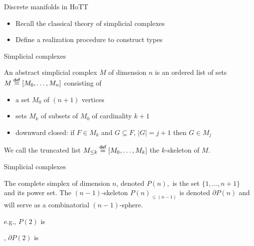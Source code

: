\documentclass[14pt,aspectratio=169]{beamer}
\renewcommand{\defemph}[1]{\alert{#1}}
\begin{document}
\begin{frame}{Discrete manifolds in HoTT}
\begin{itemize}
\item Recall the classical theory of \alert{simplicial complexes}
\item Define a \alert{realization} procedure to construct types
\end{itemize}
\end{frame}

\begin{frame}{Simplicial complexes}
\begin{mydef}
An \defemph{abstract simplicial complex \( M \) of dimension \( n \)} is an ordered list of sets \( M\stackrel{\mathsf{def}}{=}[M_0,\ldots,M_n] \) consisting of 
\begin{itemize}
\item a set \( M_0 \) of \( (n+1) \) vertices
\item sets \( M_k \) of subsets of \( M_0 \) of cardinality \( k+1 \)
\item downward closed: if \( F\in M_k \) and \( G\subseteq F \), \( |G|=j+1 \) then \( G\in M_j \)
\end{itemize}
We call the truncated list \( M_{\leq k}\stackrel{\mathsf{def}}{=} [M_0,\ldots,M_k] \) \alert{the \( k \)-skeleton of \( M \)}.
\end{mydef}
\end{frame}

\begin{frame}{Simplicial complexes}
\begin{example}
The \defemph{complete simplex of dimension \( n \)}, denoted \alert{\( P(n), \)} is the set \( \{1,\ldots,n+1\} \) and its power set. The \( (n-1) \)-skeleton \( P(n)_{\leq (n-1)} \) is denoted \alert{\( \partial P(n) \)} and will serve as a combinatorial \( (n-1) \)-sphere.
\end{example}
e.g., \( P(2) \) is
, 
\( \partial P(2) \) is
\end{frame}
\end{document}
